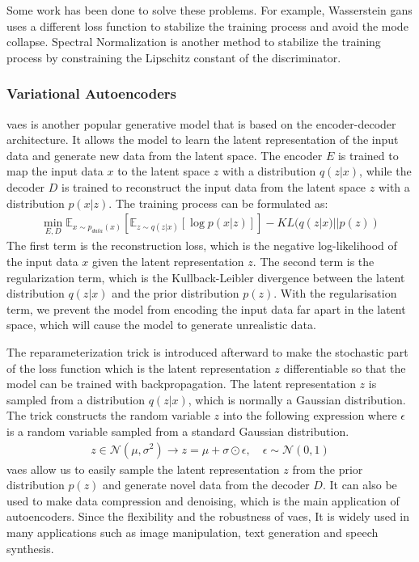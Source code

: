 \documentclass[12pt,DIV14,BCOR12mm,a4paper,footinclude=false,headinclude,parskip=half-,twoside,openright,cleardoublepage=empty,toc=index,bibliography=totoc,listof=totoc]{scrreprt}
\numberwithin{equation}{chapter}
\begin{document}
Some work has been done to solve these problems. For example, Wasserstein \glspl{gan} \cite{arjovsky2017wasserstein} uses a different loss function to stabilize the training process and avoid the mode collapse. Spectral Normalization \cite{miyato2018spectral} is another method to stabilize the training process by constraining the Lipschitz constant of the discriminator.
\subsubsection{Variational Autoencoders}
\glspl{vae} \cite{kingma2022autoencoding} is another popular generative model that is based on the encoder-decoder architecture. It allows the model to learn the latent representation of the input data and generate new data from the latent space. The encoder $E$ is trained to map the input data $x$ to the latent space $z$ with a distribution $q(z|x)$, while the decoder $D$ is trained to reconstruct the input data from the latent space $z$ with a distribution $p(x|z)$. The training process can be formulated as:
\begin{align}
  \min_{E,D} \mathbb{E}_{x\sim p_{data}(x)}[\mathbb{E}_{z\sim q(z|x)}[\log p(x|z)]] - KL(q(z|x)||p(z))
\end{align}
The first term is the reconstruction loss, which is the negative log-likelihood of the input data $x$ given the latent representation $z$. The second term is the regularization term, which is the Kullback-Leibler divergence between the latent distribution $q(z|x)$ and the prior distribution $p(z)$. With the regularisation term, we prevent the model from encoding the input data far apart in the latent space, which will cause the model to generate unrealistic data.

The reparameterization trick \cite{kingma2015variational} is introduced afterward to make the stochastic part of the loss function which is the latent representation $z$ differentiable so that the model can be trained with backpropagation. The latent representation $z$ is sampled from a distribution $q(z|x)$, which is normally a Gaussian distribution. The trick constructs the random variable $z$ into the following expression where $\epsilon$ is a random variable sampled from a standard Gaussian distribution.
\begin{align}
  z \in \mathcal{N} (\mu, \sigma^{2}) \longrightarrow z = \mu + \sigma \odot \epsilon, \quad \epsilon \sim \mathcal{N} (0, 1)
\end{align}
\glspl{vae} allow us to easily sample the latent representation $z$ from the prior distribution $p(z)$ and generate novel data from the decoder $D$. It can also be used to make data compression and denoising, which is the main application of autoencoders. Since the flexibility and the robustness of \glspl{vae}, It is widely used in many applications such as image manipulation, text generation and speech synthesis.
\end{document}
